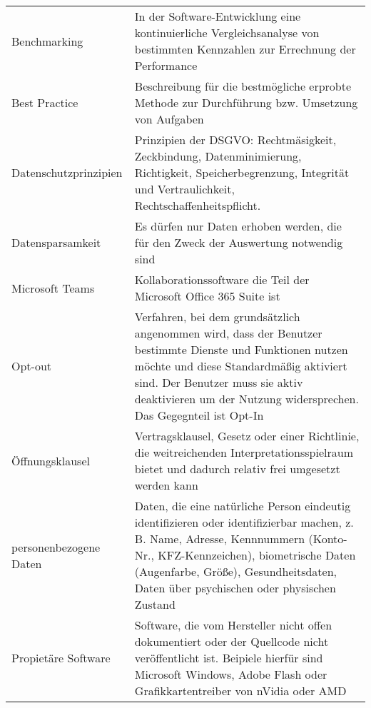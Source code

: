 \renewcommand*{\arraystretch}{1.4}
\begin{longtable}{p{}p{}}

    Benchmarking & In der Software-Entwicklung eine kontinuierliche Vergleichsanalyse von bestimmten Kennzahlen zur Errechnung der Performance\\

    Best Practice & Beschreibung für die bestmögliche erprobte Methode zur Durchführung bzw. Umsetzung von Aufgaben\\

    Datenschutzprinzipien & Prinzipien der DSGVO: Rechtmäsigkeit, Zeckbindung, Datenminimierung, Richtigkeit, Speicherbegrenzung, Integrität und Vertraulichkeit, Rechtschaffenheitspflicht.\\

    Datensparsamkeit & Es dürfen nur Daten erhoben werden, die für den Zweck der Auswertung notwendig sind\\



    Microsoft Teams & Kollaborationssoftware die Teil der Microsoft Office 365 Suite ist\\

    Opt-out & Verfahren, bei dem grundsätzlich angenommen wird, dass der Benutzer bestimmte Dienste und Funktionen nutzen möchte und diese Standardmäßig aktiviert sind. Der Benutzer muss sie aktiv deaktivieren um der Nutzung widersprechen. Das Gegegnteil ist Opt-In\\

    Öffnungsklausel & Vertragsklausel, Gesetz oder einer Richtlinie, die weitreichenden Interpretationsspielraum bietet und dadurch relativ frei umgesetzt werden kann\\

    personenbezogene Daten & Daten, die eine natürliche Person eindeutig identifizieren oder identifizierbar machen, z. B. Name, Adresse, Kennnummern (Konto-Nr., KFZ-Kennzeichen), biometrische Daten (Augenfarbe, Größe), Gesundheitsdaten, Daten über psychischen oder physischen Zustand\\

    Propietäre Software & Software, die vom Hersteller nicht offen dokumentiert oder der Quellcode nicht veröffentlicht ist. Beipiele hierfür sind Microsoft Windows, Adobe Flash oder Grafikkartentreiber von nVidia oder AMD\\


\end{longtable}
